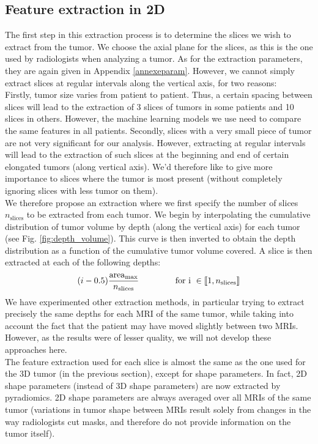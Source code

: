\documentclass[preprint,12pt]{elsarticle}
\begin{document}
\subsection{Feature extraction in 2D}
\label{sec:2D}
\noindent The first step in this extraction process is to determine the slices we wish to extract from the tumor. We choose the axial plane for the slices, as this is the one used by radiologists when analyzing a tumor. As for the extraction parameters, they are again given in Appendix \ref{annexeparam}. However, we cannot simply extract slices at regular intervals along the vertical axis, for two reasons:\\
\indent Firstly, tumor size varies from patient to patient. Thus, a certain spacing between slices will lead to the extraction of 3 slices of tumors in some patients and 10 slices in others. However, the machine learning models we use need to compare the same features in all patients. Secondly, slices with a very small piece of tumor are not very significant for our analysis. However, extracting at regular intervals will lead to the extraction of such slices at the beginning and end of certain elongated tumors (along vertical axis). We'd therefore like to give more importance to slices where the tumor is most present (without completely ignoring slices with less tumor on them).\\
\indent We therefore propose an extraction where we first specify the number of slices $n_{\text{slices}}$ to be extracted from each tumor. We begin by interpolating the cumulative distribution of tumor volume by depth (along the vertical axis) for each tumor (see Fig. \ref{fig:depth_volume}). This curve is then inverted to obtain the depth distribution as a function of the cumulative tumor volume covered. A slice is then extracted at each of the following depths: 
\begin{equation}
(i-0.5) \displaystyle{\frac{\text{area}_{\text{max}}}{n_{\text{slices}}}} \hspace{1.5 cm} \text{for i } \in \llbracket 1,n_{\text{slices}}  \rrbracket
\end{equation}
We have experimented other extraction methods, in particular trying to extract precisely the same depths for each MRI of the same tumor, while taking into account the fact that the patient may have moved slightly between two MRIs. However, as the results were of lesser quality, we will not develop these approaches here.\\
\indent The feature extraction used for each slice is almost the same as the one used for the 3D tumor (in the previous section), except for shape parameters. In fact, 2D shape parameters (instead of 3D shape parameters) are now extracted by pyradiomics. 2D shape parameters are always averaged over all MRIs of the same tumor (variations in tumor shape between MRIs result solely from changes in the way radiologists cut masks, and therefore do not provide information on the tumor itself).\\
\end{document}
